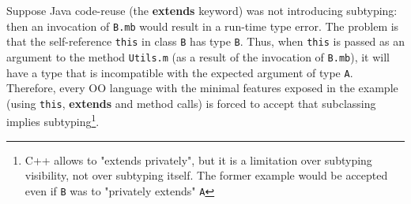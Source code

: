 Suppose Java code-reuse (the {\bf extends} keyword) was not introducing subtyping: then an invocation of 
\lstinline{B.mb} would result in a run-time type error.
The problem is that the
self-reference \lstinline{this} in class \lstinline{B} has 
type \lstinline{B}. Thus, when \lstinline{this} is passed as an argument to 
the method \lstinline{Utils.m} (as a result of the invocation of
\lstinline{B.mb}), it will have a type that is incompatible with the
expected argument of type \lstinline{A}.  
Therefore, every OO language with the minimal features exposed in the example (using \lstinline{this},
{\bf extends} and method calls) is forced to accept that subclassing implies
subtyping\footnote{C++ allows to "extends privately", but it is a limitation over
  subtyping visibility, not over subtyping itself.  The
  former example would be accepted even if \lstinline{B} was to
  "privately extends" \lstinline{A}}.
  

